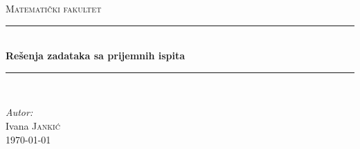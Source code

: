 \documentclass[a4paper,12pt]{report}
\begin{document}
\begin{titlepage}

\newcommand{\HRule}{\rule{\linewidth}{0.5mm}} %

\center %
 

\textsc{\LARGE Matemati\v{c}ki fakultet}\\[1.5cm]



\HRule \\[0.4cm]
{ \huge \bfseries Re\v{s}enja zadataka sa prijemnih ispita}\\[0.4cm] %
\HRule \\[1.5cm]
 
\vfill 



\emph{Autor:}\\
Ivana \textsc{Janki\'{c}}\\[3cm] %


{\large \today}\\[3cm] %


 

\end{titlepage}
\tableofcontents
\end{document}
